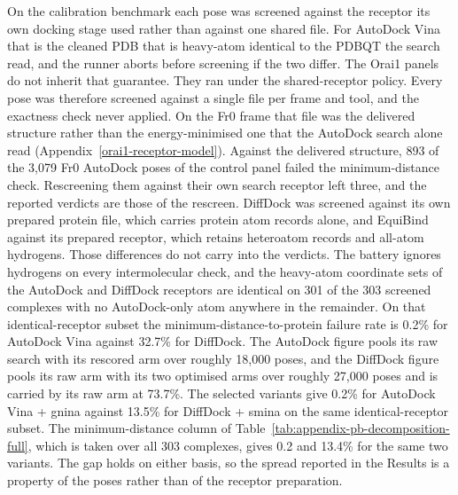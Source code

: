 On the calibration benchmark each pose was screened against the receptor its own docking stage used rather than against one shared file. For AutoDock Vina that is the cleaned PDB that is heavy-atom identical to the PDBQT the search read, and the runner aborts before screening if the two differ. The Orai1 panels do not inherit that guarantee. They ran under the shared-receptor policy. Every pose was therefore screened against a single file per frame and tool, and the exactness check never applied. On the Fr0 frame that file was the delivered structure rather than the energy-minimised one that the AutoDock search alone read (Appendix~\ref{orai1-receptor-model}). Against the delivered structure, 893 of the 3,079 Fr0 AutoDock poses of the control panel failed the minimum-distance check. Rescreening them against their own search receptor left three, and the reported verdicts are those of the rescreen. DiffDock was screened against its own prepared protein file, which carries protein atom records alone, and EquiBind against its prepared receptor, which retains heteroatom records and all-atom hydrogens. Those differences do not carry into the verdicts. The battery ignores hydrogens on every intermolecular check, and the heavy-atom coordinate sets of the AutoDock and DiffDock receptors are identical on 301 of the 303 screened complexes with no AutoDock-only atom anywhere in the remainder. On that identical-receptor subset the minimum-distance-to-protein failure rate is 0.2\% for AutoDock Vina against 32.7\% for DiffDock. The AutoDock figure pools its raw search with its rescored arm over roughly 18,000 poses, and the DiffDock figure pools its raw arm with its two optimised arms over roughly 27,000 poses and is carried by its raw arm at 73.7\%. The selected variants give 0.2\% for AutoDock Vina + gnina against 13.5\% for DiffDock + smina on the same identical-receptor subset. The minimum-distance column of Table~\ref{tab:appendix-pb-decomposition-full}, which is taken over all 303 complexes, gives 0.2 and 13.4\% for the same two variants. The gap holds on either basis, so the spread reported in the Results is a property of the poses rather than of the receptor preparation.

